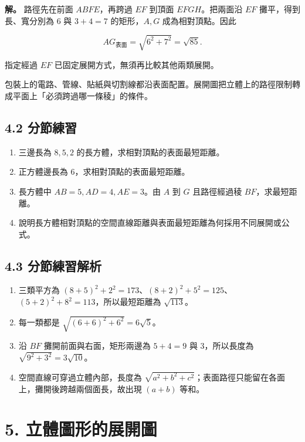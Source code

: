 \documentclass[11pt,a4paper]{article}
\providecommand{\tightlist}{%
  \setlength{\itemsep}{0pt}\setlength{\parskip}{0pt}}
\begin{document}
\textbf{解。} 路徑先在前面 \(ABFE\)，再跨過 \(EF\) 到頂面 \(EFGH\)。把兩面沿 \(EF\) 攤平，得到長、寬分別為 \(6\) 與 \(3+4=7\) 的矩形，\(A,G\) 成為相對頂點。因此

\[
AG_{\text{表面}}=\sqrt{6^2+7^2}=\sqrt{85}.
\]

指定經過 \(EF\) 已固定展開方式，無須再比較其他兩類展開。

包裝上的電路、管線、貼紙與切割線都沿表面配置。展開圖把立體上的路徑限制轉成平面上「必須跨過哪一條稜」的條件。

\subsection{4.2 分節練習}\label{ux5206ux7bc0ux7df4ux7fd2-3}

\begin{enumerate}
\def\labelenumi{\arabic{enumi}.}
\tightlist
\item
  三邊長為 \(8,5,2\) 的長方體，求相對頂點的表面最短距離。
\item
  正方體邊長為 \(6\)，求相對頂點的表面最短距離。
\item
  長方體中 \(AB=5,AD=4,AE=3\)。由 \(A\) 到 \(G\) 且路徑經過稜 \(BF\)，求最短距離。
\item
  說明長方體相對頂點的空間直線距離與表面最短距離為何採用不同展開或公式。
\end{enumerate}

\subsection{4.3 分節練習解析}\label{ux5206ux7bc0ux7df4ux7fd2ux89e3ux6790-3}

\begin{enumerate}
\def\labelenumi{\arabic{enumi}.}
\tightlist
\item
  三類平方為 \((8+5)^2+2^2=173\)、\((8+2)^2+5^2=125\)、\((5+2)^2+8^2=113\)，所以最短距離為 \(\sqrt{113}\)。
\item
  每一類都是 \(\sqrt{(6+6)^2+6^2}=6\sqrt5\)。
\item
  沿 \(BF\) 攤開前面與右面，矩形兩邊為 \(5+4=9\) 與 \(3\)，所以長度為 \(\sqrt{9^2+3^2}=3\sqrt{10}\)。
\item
  空間直線可穿過立體內部，長度為 \(\sqrt{a^2+b^2+c^2}\)；表面路徑只能留在各面上，攤開後跨越兩個面長，故出現 \((a+b)\) 等和。
\end{enumerate}

\section{5. 立體圖形的展開圖}\label{ux7acbux9ad4ux5716ux5f62ux7684ux5c55ux958bux5716}
\end{document}

